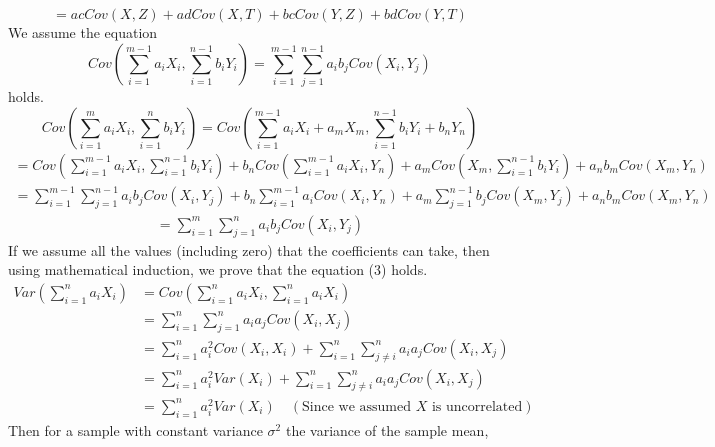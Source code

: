 \documentclass{article}
\numberwithin{equation}{subsection}
\begin{document}
\begin{equation}
    = acCov(X,Z)+adCov(X,T)+bcCov(Y,Z)+bdCov(Y,T)
\end{equation}
We assume the equation
\begin{equation}
    Cov(\sum_{i=1}^{m-1} a_i X_i, \sum_{i=1}^{n-1} b_i Y_i) = \sum_{i=1}^{m-1} \sum_{j=1}^{n-1} a_i b_j Cov(X_i, Y_j)
\end{equation}
holds. 
\begin{equation}
    Cov(\sum_{i=1}^{m} a_i X_i, \sum_{i=1}^{n} b_i Y_i) = Cov(\sum_{i=1}^{m-1} a_i X_i + a_m X_m, \sum_{i=1}^{n-1} b_i Y_i + b_n Y_n)
\end{equation}
\begin{equation}
    \begin{split}
        =Cov(\sum_{i=1}^{m-1} a_i X_i,\sum_{i=1}^{n-1} b_i Y_i)+b_nCov(\sum_{i=1}^{m-1} a_i X_i,Y_n)+
        a_mCov(X_m,\sum_{i=1}^{n-1} b_i Y_i)+a_n b_mCov(X_m,Y_n)
    \end{split}
\end{equation}
\begin{equation}
    \begin{split}
         =\sum_{i=1}^{m-1} \sum_{j=1}^{n-1} a_i b_j Cov(X_i, Y_j)+b_n\sum_{i=1}^{m-1} a_iCov(X_i, Y_n)+a_m\sum_{j=1}^{n-1} b_j Cov(X_m, Y_j)+a_n b_mCov(X_m,Y_n)
    \end{split}
\end{equation}
\begin{equation}
    \begin{split}
         =\sum_{i=1}^{m} \sum_{j=1}^{n} a_i b_j Cov(X_i, Y_j)
    \end{split}
\end{equation}
If we assume all the values (including zero) that the coefficients can take, then using mathematical induction, we prove that the equation (3) holds. 
\begin{align}
    Var(\sum_{i=1}^{n} a_i X_i) &= Cov(\sum_{i=1}^{n} a_i X_i, \sum_{i=1}^{n} a_i X_i)\\
    &= \sum_{i=1}^{n} \sum_{j=1}^{n} a_i a_j Cov(X_i, X_j)\\
    &= \sum_{i=1}^{n} a_i^2 Cov(X_i, X_i) + \sum_{i=1}^{n} \sum_{j \neq i}^{n} a_i a_j Cov(X_i, X_j)\\
    &= \sum_{i=1}^{n} a_i^2 Var(X_i) + \sum_{i=1}^{n} \sum_{j \neq i}^{n} a_i a_j Cov(X_i, X_j)\\
    &= \sum_{i=1}^{n} a_i^2 Var(X_i) \quad (\text{Since we assumed $X$ is uncorrelated})
\end{align}
Then for a sample with constant variance $\sigma^2$ the variance of the sample mean,
\end{document}
